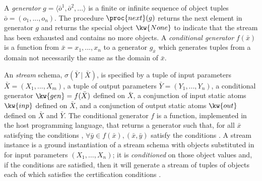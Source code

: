 \documentclass[letterpaper]{article} %
\theoremstyle{plain}\newtheorem{thm}{Theorem}
\theoremstyle{definition}\newtheorem{defn}{Definition}
\theoremstyle{plain}\newtheorem{lem}{Lemma}
\theoremstyle{plain}\newtheorem{cor}{Corollary}
\begin{document}
A {\em generator} $g = \langle \bar{o}^1, \bar{o}^2, ... \rangle$ is a
finite or infinite sequence of object tuples $\bar{o} = (o_1, ...,
o_n)$.
The procedure $\proc{next}(g)$ returns the next element in generator
$g$ and returns the special object $\kw{None}$ to indicate that the
stream has been exhausted and contains no more objects.
A {\em conditional generator} $f(\bar{x})$ is a function from $\bar{x}
= x_1, ..., x_n$ to a generator $g_{\bar{x}}$ which generates tuples
from a domain not necessarily the same as the domain of $\bar{x}$. 

An {\em stream} schema, $\sigma(\bar{Y} \mid \bar{X})$, is specified
by a 
tuple of input parameters $\bar{X} = (X_1, ..., X_m)$, a tuple of
output parameters $\bar{Y} = (Y_1, ..., Y_n)$, a conditional generator
$\kw{gen} =  f(\bar{X})$ defined on $\bar{X}$, a conjunction of input static
atoms $\kw{inp}$ defined on $\bar{X}$, and a conjunction of output static
atoms $\kw{out}$ defined on $\bar{X}$ and $\bar{Y}$. 
The conditional generator $f$ is a function, implemented in the host
programming language, that returns a generator such that,
for all $\bar{x}$ satisfying the conditions , $\forall \bar{y}
\in f(\bar{x}), (\bar{x}, \bar{y})$ satisfy the conditions . 
A stream instance is a ground instantiation of a stream schema with
objects substituted in for input parameters $(X_1, \ldots, X_n)$;  it
is {\em conditioned} on those object values and, if the 
conditions are satisfied, then it will generate a stream of tuples of
objects each of which satisfies the certification conditions .


\end{document}
